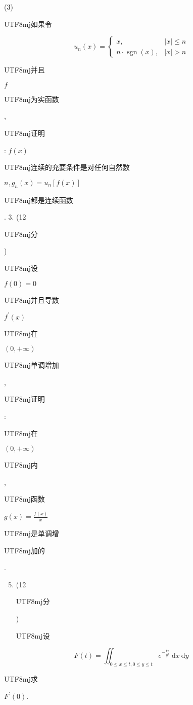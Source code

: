 \documentclass[10pt]{article}
\begin{document}
(3) \begin{CJK}{UTF8}{mj}如果令\end{CJK}
$$
u_{n}(x)= \begin{cases}x, & |x| \leqslant n \\ n \cdot \operatorname{sgn}(x), & |x|>n\end{cases}
$$
\begin{CJK}{UTF8}{mj}并且\end{CJK} $f$ \begin{CJK}{UTF8}{mj}为实函数\end{CJK}, \begin{CJK}{UTF8}{mj}证明\end{CJK}: $f(x)$ \begin{CJK}{UTF8}{mj}连续的充要条件是对任何自然数\end{CJK} $n, g_{n}(x)=u_{n}[f(x)]$ \begin{CJK}{UTF8}{mj}都是连续函数\end{CJK}. 3. (12 \begin{CJK}{UTF8}{mj}分\end{CJK}) \begin{CJK}{UTF8}{mj}设\end{CJK} $f(0)=0$ \begin{CJK}{UTF8}{mj}并且导数\end{CJK} $f^{\prime}(x)$ \begin{CJK}{UTF8}{mj}在\end{CJK} $(0,+\infty)$ \begin{CJK}{UTF8}{mj}单调增加\end{CJK}, \begin{CJK}{UTF8}{mj}证明\end{CJK}: \begin{CJK}{UTF8}{mj}在\end{CJK} $(0,+\infty)$ \begin{CJK}{UTF8}{mj}内\end{CJK}, \begin{CJK}{UTF8}{mj}函数\end{CJK} $g(x)=\frac{f(x)}{x}$ \begin{CJK}{UTF8}{mj}是单调增\end{CJK} \begin{CJK}{UTF8}{mj}加的\end{CJK}.

\begin{enumerate}
  \setcounter{enumi}{4}
  \item (12 \begin{CJK}{UTF8}{mj}分\end{CJK}) \begin{CJK}{UTF8}{mj}设\end{CJK}
\end{enumerate}
$$
F(t)=\iint_{0 \leqslant x \leqslant t, 0 \leqslant y \leqslant t} e^{-\frac{t x}{y^{2}}} \mathrm{~d} x \mathrm{~d} y
$$
\begin{CJK}{UTF8}{mj}求\end{CJK} $F^{\prime}(0)$.
\end{document}

